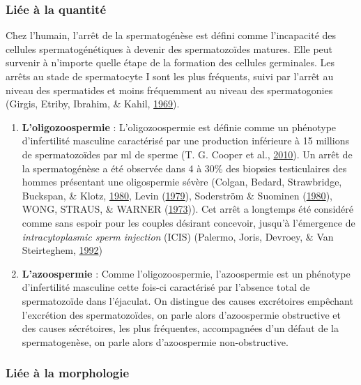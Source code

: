 \documentclass[12pt,twoside]{reedthesis}
\providecommand{\tightlist}{%
  \setlength{\itemsep}{0pt}\setlength{\parskip}{0pt}}
\theoremstyle{definition}
\theoremstyle{definition}
\theoremstyle{remark}
\begin{document}
  \hypertarget{infquant}{\subsubsection{Liée à la
  quantité}\label{infquant}}
  
  Chez l'humain, l'arrêt de la spermatogénèse est défini comme
  l'incapacité des cellules spermatogénétiques à devenir des
  spermatozoïdes matures. Elle peut survenir à n'importe quelle étape de
  la formation des cellules germinales. Les arrêts au stade de
  spermatocyte I sont les plus fréquents, suivi par l'arrêt au niveau des
  spermatides et moins fréquemment au niveau des spermatogonies (Girgis,
  Etriby, Ibrahim, \& Kahil, \protect\hyperlink{ref-Girgis}{1969}).
  
  \begin{enumerate}
  \def\labelenumi{\arabic{enumi}.}
  \tightlist
  \item
    \textbf{L'oligozoospermie} : L'oligozoospermie est définie comme un
    phénotype d'infertilité masculine caractérisé par une production
    inférieure à 15 millions de spermatozoïdes par ml de sperme (T. G.
    Cooper et al., \protect\hyperlink{ref-Cooper2010}{2010}). Un arrêt de
    la spermatogénèse a été observée dans 4 à 30\% des biopsies
    testiculaires des hommes présentant une oligospermie sévère (Colgan,
    Bedard, Strawbridge, Buckspan, \& Klotz,
    \protect\hyperlink{ref-Colgan1980}{1980}, Levin
    (\protect\hyperlink{ref-Levin1979}{1979}), Soderström \& Suominen
    (\protect\hyperlink{ref-Soderstrom1980}{1980}), WONG, STRAUS, \&
    WARNER (\protect\hyperlink{ref-WONG1973}{1973})). Cet arrêt a
    longtemps été considéré comme sans espoir pour les couples désirant
    concevoir, jusqu'à l'émergence de \emph{intracytoplasmic sperm
    injection} (ICIS) (Palermo, Joris, Devroey, \& Van Steirteghem,
    \protect\hyperlink{ref-Palermo1992}{1992})\\
  \item
    \textbf{L'azoospermie} : Comme l'oligozoospermie, l'azoospermie est un
    phénotype d'infertilité masculine cette fois-ci caractérisé par
    l'absence total de spermatozoïde dans l'éjaculat. On distingue des
    causes excrétoires empêchant l'excrétion des spermatozoïdes, on parle
    alors d'azoospermie obstructive et des causes sécrétoires, les plus
    fréquentes, accompagnées d'un défaut de la spermatogenèse, on parle
    alors d'azoospermie non-obstructive.
  \end{enumerate}
  
  \subsubsection{Liée à la morphologie}\label{liee-a-la-morphologie}
  
\end{document}
